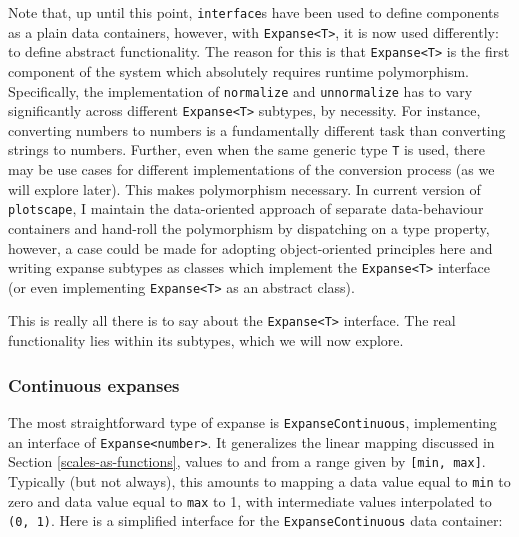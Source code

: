 \documentclass[
  openany]{book}
\theoremstyle{definition}
\theoremstyle{definition}
\theoremstyle{definition}
\theoremstyle{definition}
\theoremstyle{remark}
\begin{document}
Note that, up until this point, \texttt{interface}s have been used to define components as a plain data containers, however, with \texttt{Expanse\textless{}T\textgreater{}}, it is now used differently: to define abstract functionality. The reason for this is that \texttt{Expanse\textless{}T\textgreater{}} is the first component of the system which absolutely requires runtime polymorphism. Specifically, the implementation of \texttt{normalize} and \texttt{unnormalize} has to vary significantly across different \texttt{Expanse\textless{}T\textgreater{}} subtypes, by necessity. For instance, converting numbers to numbers is a fundamentally different task than converting strings to numbers. Further, even when the same generic type \texttt{T} is used, there may be use cases for different implementations of the conversion process (as we will explore later). This makes polymorphism necessary. In current version of \texttt{plotscape}, I maintain the data-oriented approach of separate data-behaviour containers and hand-roll the polymorphism by dispatching on a type property, however, a case could be made for adopting object-oriented principles here and writing expanse subtypes as classes which implement the \texttt{Expanse\textless{}T\textgreater{}} interface (or even implementing \texttt{Expanse\textless{}T\textgreater{}} as an abstract class).

This is really all there is to say about the \texttt{Expanse\textless{}T\textgreater{}} interface. The real functionality lies within its subtypes, which we will now explore.

\subsubsection{Continuous expanses}\label{continuous-expanses}

The most straightforward type of expanse is \texttt{ExpanseContinuous}, implementing an interface of \texttt{Expanse\textless{}number\textgreater{}}. It generalizes the linear mapping discussed in Section \ref{scales-as-functions}, values to and from a range given by \texttt{{[}min,\ max{]}}. Typically (but not always), this amounts to mapping a data value equal to \texttt{min} to zero and data value equal to \texttt{max} to 1, with intermediate values interpolated to \texttt{(0,\ 1)}. Here is a simplified interface for the \texttt{ExpanseContinuous} data container:
\end{document}
